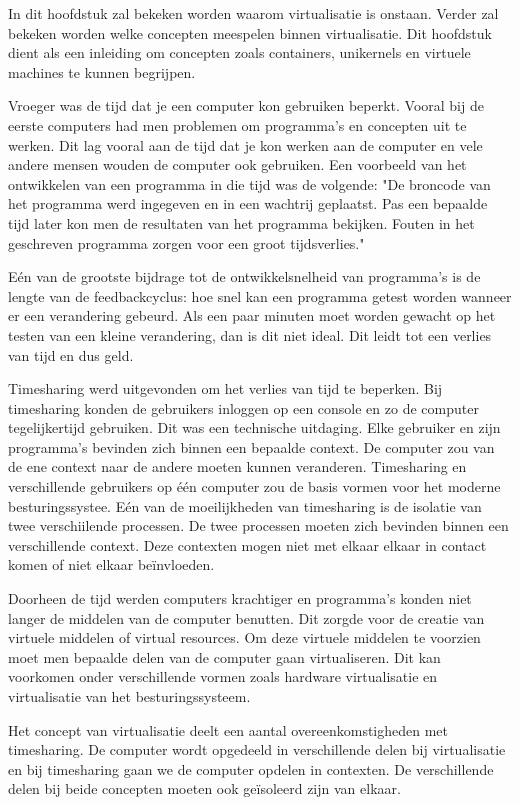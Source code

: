 \documentclass[pdftex,a4paper,12pt,twoside]{report}
\begin{document}
In dit hoofdstuk zal bekeken worden waarom virtualisatie is onstaan. Verder zal bekeken worden welke concepten meespelen binnen virtualisatie. Dit hoofdstuk dient als een inleiding om concepten zoals containers, unikernels en virtuele machines te kunnen begrijpen.

Vroeger was de tijd dat je een computer kon gebruiken beperkt. Vooral bij de eerste computers had men problemen om programma's en concepten uit te werken. Dit lag vooral aan de tijd dat je kon werken aan de computer en vele andere mensen wouden de computer ook gebruiken. Een voorbeeld van het ontwikkelen van een programma in die tijd was de volgende: "De broncode van het programma werd ingegeven en in een wachtrij geplaatst. Pas een bepaalde tijd later kon men de resultaten van het programma bekijken. Fouten in het geschreven programma zorgen voor een groot tijdsverlies."

Eén van de grootste bijdrage tot de ontwikkelsnelheid van programma's is de lengte van de feedbackcyclus: hoe snel kan een programma getest worden wanneer er een verandering gebeurd. Als een paar minuten moet worden gewacht op het testen van een kleine verandering, dan is dit niet ideal. Dit leidt tot een verlies van tijd en dus geld.

Timesharing werd uitgevonden om het verlies van tijd te beperken. Bij timesharing konden de gebruikers inloggen op een console en zo de computer tegelijkertijd gebruiken. Dit was een technische uitdaging. Elke gebruiker en zijn programma's bevinden zich binnen een bepaalde context. De computer zou van de ene context naar de andere moeten kunnen veranderen. Timesharing en verschillende gebruikers op één computer zou de basis vormen voor het moderne besturingssystee. Eén van de moeilijkheden van timesharing is de isolatie van twee verschiilende processen. De twee processen moeten zich bevinden binnen een verschillende context. Deze contexten mogen niet met elkaar elkaar in contact komen of niet elkaar beïnvloeden.

Doorheen de tijd werden computers krachtiger en programma's konden niet langer de middelen van de computer benutten. Dit zorgde voor de creatie van virtuele middelen of virtual resources. Om deze virtuele middelen te voorzien moet men bepaalde delen van de computer gaan virtualiseren. Dit kan voorkomen onder verschillende vormen zoals hardware virtualisatie en virtualisatie van het besturingssysteem. 

Het concept van virtualisatie deelt een aantal overeenkomstigheden met timesharing. De computer wordt opgedeeld in verschillende delen bij virtualisatie en bij timesharing gaan we de computer opdelen in contexten. De verschillende delen bij beide concepten moeten ook geïsoleerd zijn van elkaar.
\end{document}
